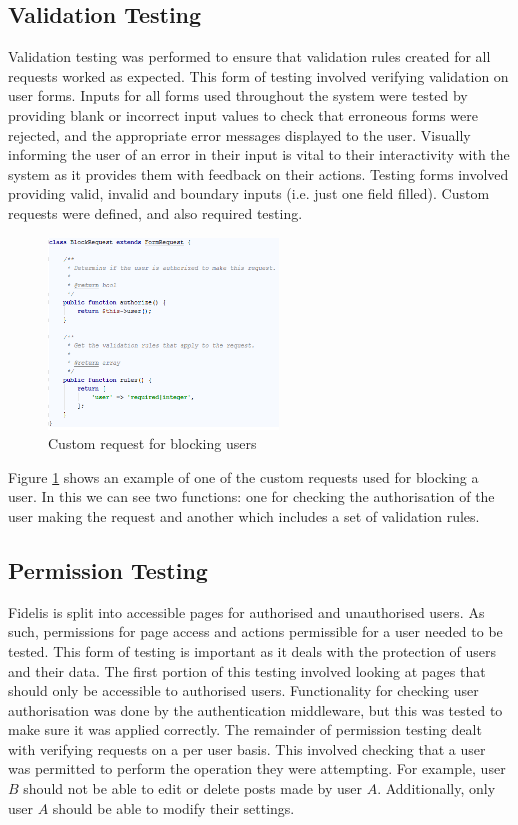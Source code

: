 \subsection{Validation Testing}
Validation testing was performed to ensure that validation rules created for all requests worked as expected. This form of testing involved verifying validation on user forms. Inputs for all forms used throughout the system were tested by providing blank or incorrect input values to check that erroneous forms were rejected, and the appropriate error messages displayed to the user. Visually informing the user of an error in their input is vital to their interactivity with the system as it provides them with feedback on their actions. Testing forms involved providing valid, invalid and boundary inputs (i.e. just one field filled). Custom requests were defined, and also required testing.

\begin{figure}[H]
\centering
\includegraphics[height=2in]{Images/Testing/BlockRequest}
\caption{Custom request for blocking users}
\label{fig:BlockRequest}
\end{figure}

Figure \ref{fig:BlockRequest} shows an example of one of the custom requests used for blocking a user. In this we can see two functions: one for checking the authorisation of the user making the request and another which includes a set of validation rules. 

\subsection{Permission Testing}
Fidelis is split into accessible pages for authorised and unauthorised users. As such, permissions for page access and actions permissible for a user needed to be tested. This form of testing is important as it deals with the protection of users and their data. The first portion of this testing involved looking at pages that should only be accessible to authorised users. Functionality for checking user authorisation was done by the authentication middleware, but this was tested to make sure it was applied correctly. The remainder of permission testing dealt with verifying requests on a per user basis. This involved checking that a user was permitted to perform the operation they were attempting. For example, user $B$ should not be able to edit or delete posts made by user $A$. Additionally, only user $A$ should be able to modify their settings.

